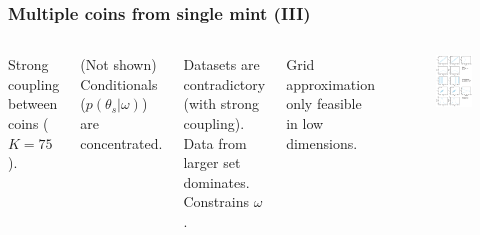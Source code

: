 \documentclass[usenames,dvipsnames,table]{beamer}
\begin{document}
\begin{frame}
\frametitle{Multiple coins from single mint (III)}
\begin{columns}[c]
Strong coupling between coins ($K=75$).

\vspace{1em}
(Not shown) Conditionals ($p(\theta_s|\omega)$) are concentrated.

\vspace{1em}
Datasets are contradictory (with strong coupling). Data from larger set dominates. Constrains $\omega$.

\vspace{1em}
Grid approximation only feasible in low dimensions.
\begin{figure}
\centering
\includegraphics[height=0.8\textheight]{img/fig9_6}
\end{figure}
\end{columns}
\end{frame}
\end{document}
